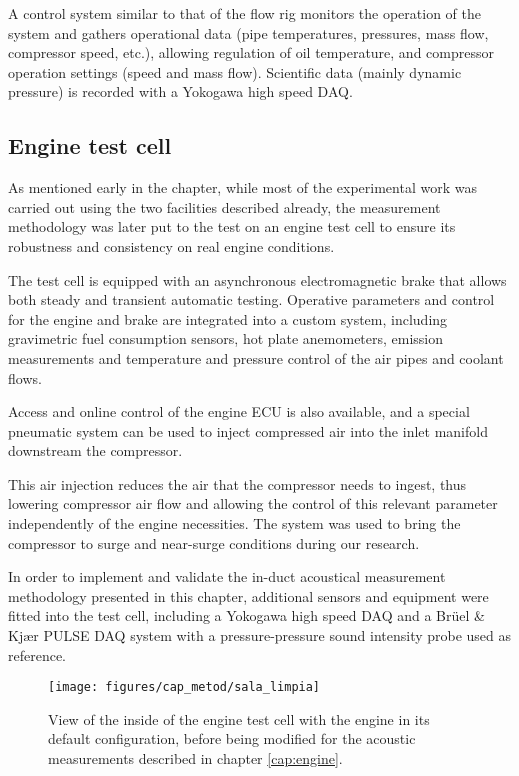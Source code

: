 A control system similar to that of the flow rig monitors the operation of the system and gathers operational data (pipe temperatures, pressures, mass flow, compressor speed, etc.), allowing regulation of oil temperature, and compressor operation settings (speed and mass flow). Scientific data (mainly dynamic pressure) is recorded with a Yokogawa high speed DAQ.

\subsection{Engine test cell} \label{sub:engine_cell}

As mentioned early in the chapter, while most of the experimental work was carried out using the two facilities described already, the measurement methodology was later put to the test on an engine test cell to ensure its robustness and consistency on real engine conditions.

The test cell is equipped with an asynchronous electromagnetic brake that allows both steady and transient automatic testing. Operative parameters and control for the engine and brake are integrated into a custom system, including gravimetric fuel consumption sensors, hot plate anemometers, emission measurements and temperature and pressure control of the air pipes and coolant flows.

Access and online control of the engine ECU is also available, and a special pneumatic system can be used to inject compressed air into the inlet manifold downstream the compressor.

This air injection reduces the air that the compressor needs to ingest, thus lowering compressor air flow and allowing the control of this relevant parameter independently of the engine necessities. The system was used to bring the compressor to surge and near-surge conditions during our research.

In order to implement and validate the in-duct acoustical measurement methodology presented in this chapter, additional sensors and equipment were fitted into the test cell, including a Yokogawa high speed DAQ and a Brüel \& Kjær PULSE DAQ system with a pressure-pressure sound intensity probe used as reference.

\begin{figure}[t!]
\centering
\texttt{[image: figures/cap\_metod/sala\_limpia]}
\caption{View of the inside of the engine test cell with the engine in its default configuration, before being modified for the acoustic measurements described in chapter \ref{cap:engine}.}
\label{fig:engine_cell_clear}
\end{figure}

